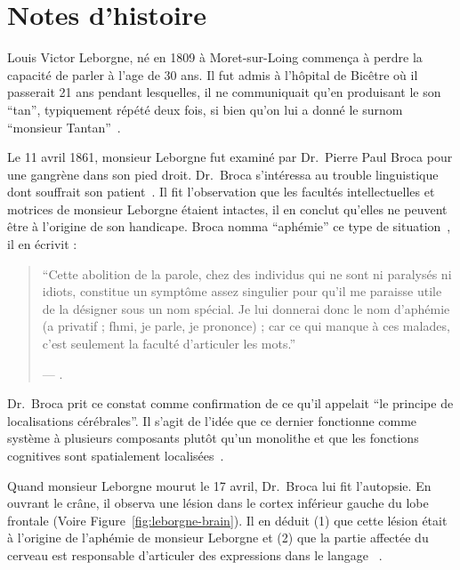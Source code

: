 \section{Notes d'histoire}

Louis Victor Leborgne, né en 1809 à Moret-sur-Loing commença à perdre la capacité de parler à l'age de 30 ans.
Il fut admis à l'hôpital de Bicêtre où il passerait 21 ans pendant lesquelles, 
il ne communiquait qu'en produisant le son ``tan'', typiquement répété deux fois, 
si bien qu'on lui a donné le surnom ``monsieur Tantan''~\cite{Mohammed_Narayan_Patra_Nanda_2018}.

Le 11 avril 1861, monsieur Leborgne fut examiné par Dr.~Pierre Paul Broca pour une gangrène dans son pied droit.
Dr.~Broca s'intéressa au trouble linguistique dont souffrait son patient~\cite{Lorch_2011}.
Il fit l'observation que les facultés intellectuelles et motrices de monsieur Leborgne étaient intactes,
il en conclut qu'elles ne peuvent être à l'origine de son handicape. 
Broca nomma ``aphémie'' ce type de situation~\cite{Broca}, il en écrivit :

\begin{quotation}
    ``Cette abolition de la parole, chez des individus qui ne sont ni paralysés ni idiots, constitue un symptôme assez singulier pour qu'il me paraisse utile de la désigner sous un nom spécial. Je lui donnerai donc le nom d'aphémie (\textgreek{a} privatif ; \textgreek{fhmi}, je parle, je prononce) ; car ce qui manque à ces malades, c'est seulement la faculté d'articuler les mots.''
    \begin{flushright}
        \rm --- \cite{Broca}.
    \end{flushright}
\end{quotation}

Dr.~Broca prit ce constat comme confirmation de ce qu'il appelait 
``le principe de localisations cérébrales''.
Il s'agit de l'idée que ce dernier fonctionne comme système à plusieurs composants plutôt qu'un monolithe
et que les fonctions cognitives sont spatialement localisées~\cite{Fodor_1983}.

Quand monsieur Leborgne mourut le 17 avril, Dr.~Broca lui fit l'autopsie.
En ouvrant le crâne, il observa une lésion dans le cortex inférieur gauche du lobe frontale 
(Voire Figure~\ref{fig:leborgne-brain}).
Il en déduit (1) que cette lésion était à l'origine de l'aphémie de monsieur Leborgne et 
(2) que la partie affectée du cerveau est responsable d'articuler des expressions dans le langage
~\cite{Broca,Lorch_2011,Mohammed_Narayan_Patra_Nanda_2018}.

